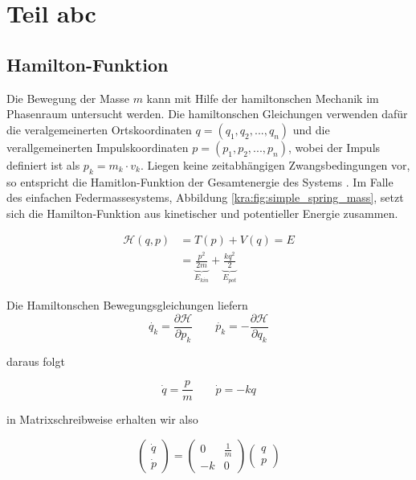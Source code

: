 \newcommand{\dt}[0]{\frac{d}{dt}}

\section{Teil abc\label{kra:section:teilabc}}

\subsection{Hamilton-Funktion}
Die Bewegung der Masse $m$ kann mit Hilfe der hamiltonschen Mechanik im Phasenraum untersucht werden.
Die hamiltonschen Gleichungen verwenden dafür die veralgemeinerten Ortskoordinaten
$q = (q_{1}, q_{2}, ..., q_{n})$ und die verallgemeinerten Impulskoordinaten $p = (p_{1}, p_{2}, ..., p_{n})$,
wobei der Impuls definiert ist als $p_k = m_k \cdot v_k$.
Liegen keine zeitabhängigen Zwangsbedingungen vor, so entspricht die Hamitlon-Funktion der Gesamtenergie des Systems \cite{kra:hamilton}.
Im Falle des einfachen Federmassesystems, Abbildung \ref{kra:fig:simple_spring_mass},
setzt sich die Hamilton-Funktion aus kinetischer und potentieller Energie zusammen.

\begin{equation}
    \label{hamilton}
    \begin{split}
        \mathcal{H}(q, p) &= T(p) + V(q) = E \\
        &= \underbrace{\frac{p^2}{2m}}_{E_{kin}} + \underbrace{\frac{k q^2}{2}}_{E_{pot}}
    \end{split}
\end{equation}

Die Hamiltonschen Bewegungsgleichungen liefern \cite{kra:kanonischegleichungen}
\begin{equation}
    \label{kra:hamilton:bewegungsgleichung}
    \dot{q_{k}} = \frac{\partial \mathcal{H}}{\partial p_k}
    \qquad
    \dot{p_{k}} = -\frac{\partial \mathcal{H}}{\partial q_k}
\end{equation}

daraus folgt

\[
    \dot{q} = \frac{p}{m}
    \qquad
    \dot{p} = -kq
\]

in Matrixschreibweise erhalten wir also

\[
    \begin{pmatrix}
        \dot{q} \\
        \dot{p}
    \end{pmatrix}
    =
    \begin{pmatrix}
        0  & \frac{1}{m} \\
        -k & 0
    \end{pmatrix}
    \begin{pmatrix}
        q \\
        p
    \end{pmatrix}
\]

